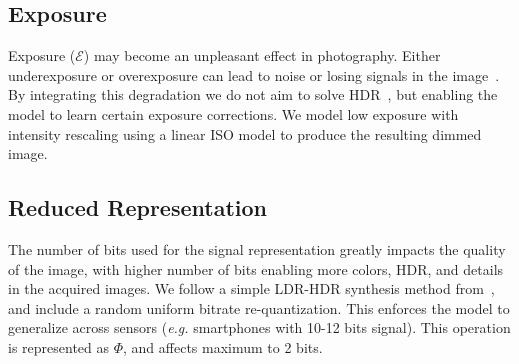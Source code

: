 \documentclass{article}
\newcommand{\eg}{\emph{e.g.} }
\begin{document}
\subsection{Exposure}

Exposure ($\mathcal{E}$) may become an unpleasant effect in photography. Either underexposure or overexposure can lead to noise or losing signals in the image~\cite{chen2018learning, hasinoff2016burst}. By integrating this degradation we do not aim to solve HDR~\cite{hasinoff2016burst}, but enabling the model to learn certain exposure corrections. %
We model low exposure with intensity rescaling using a linear ISO model to produce the resulting dimmed image. 

\subsection{Reduced Representation}

The number of bits used for the signal representation greatly impacts the quality of the image, with higher number of bits enabling more colors, HDR, and details in the acquired images. %
We follow a simple LDR-HDR synthesis method from~\cite{liu2020single}, and include a random uniform bitrate re-quantization. This enforces the model to generalize across sensors (\eg smartphones with 10-12 bits signal).
This operation is represented as $\Phi$, and affects maximum to 2 bits.
\end{document}
